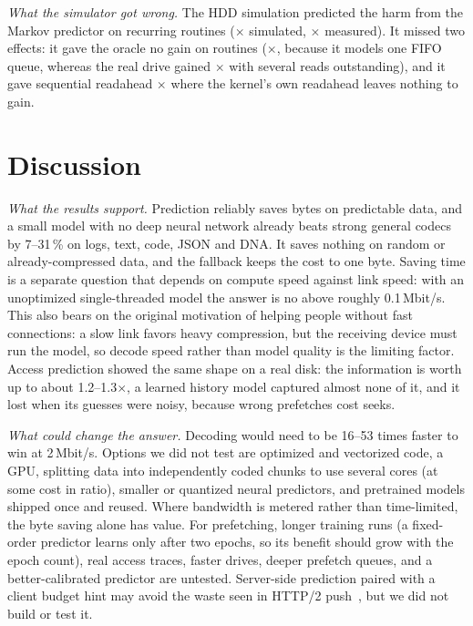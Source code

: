 \documentclass[conference]{IEEEtran}
\begin{document}
\emph{What the simulator got wrong.} The HDD simulation predicted the harm from the Markov predictor on recurring routines (\simHddMarkovRoutines$\times$ simulated, \realMarkovRoutines$\times$ measured). It missed two effects: it gave the oracle no gain on routines (\simHddOracleRoutines$\times$, because it models one FIFO queue, whereas the real drive gained \realOracleRoutines$\times$ with several reads outstanding), and it gave sequential readahead \simHddSequential$\times$ where the kernel's own readahead leaves nothing to gain.

\section{Discussion}
\emph{What the results support.} Prediction reliably saves bytes on predictable data, and a small model with no deep neural network already beats strong general codecs by 7--31\,\% on logs, text, code, JSON and DNA. It saves nothing on random or already-compressed data, and the fallback keeps the cost to one byte. Saving time is a separate question that depends on compute speed against link speed: with an unoptimized single-threaded model the answer is no above roughly 0.1\,Mbit/s. This also bears on the original motivation of helping people without fast connections: a slow link favors heavy compression, but the receiving device must run the model, so decode speed rather than model quality is the limiting factor. Access prediction showed the same shape on a real disk: the information is worth up to about 1.2--1.3$\times$, a learned history model captured almost none of it, and it lost when its guesses were noisy, because wrong prefetches cost seeks.

\emph{What could change the answer.} Decoding would need to be 16--53 times faster to win at 2\,Mbit/s. Options we did not test are optimized and vectorized code, a GPU, splitting data into independently coded chunks to use several cores (at some cost in ratio), smaller or quantized neural predictors, and pretrained models shipped once and reused. Where bandwidth is metered rather than time-limited, the byte saving alone has value. For prefetching, longer training runs (a fixed-order predictor learns only after two epochs, so its benefit should grow with the epoch count), real access traces, faster drives, deeper prefetch queues, and a better-calibrated predictor are untested. Server-side prediction paired with a client budget hint may avoid the waste seen in HTTP/2 push~\cite{chromium_push}, but we did not build or test it.
\end{document}
